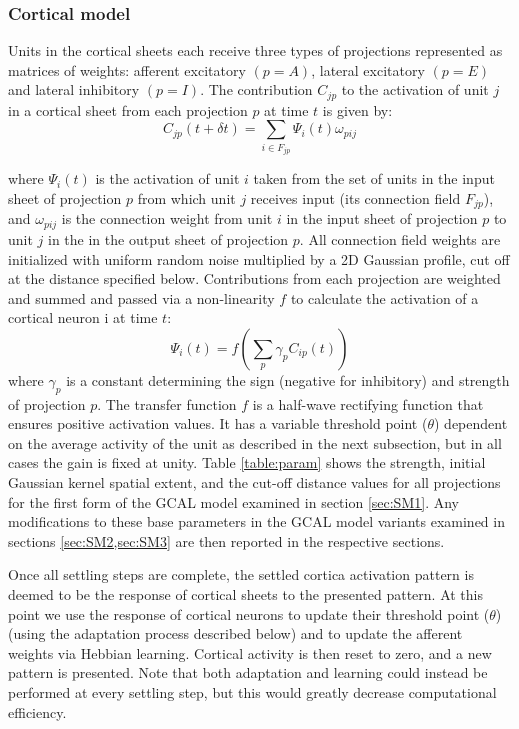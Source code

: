 \documentclass[a4paper,10pt]{article}
\begin{document}
\subsubsection{Cortical model}

Units in the cortical sheets each receive three types of projections represented as matrices of weights: afferent excitatory $(p=A)$, 
lateral excitatory $(p=E)$ and lateral inhibitory $(p=I)$.  The contribution $C_{jp}$ to the activation of unit $j$ in a cortical sheet from each projection $p$ at time $t$ is given by: 
\begin{equation} 
C_{jp}(t+\delta t)=\sum_{i\in F_{jp}}\Psi_{i}(t)\omega_{pij} 
\end{equation} 

\noindent where $\Psi_{i}(t)$ is the activation of unit $i$ taken from the set of units in the input
sheet of projection $p$ from which unit $j$ receives input (its connection field $F_{jp}$), and $\omega_{pij}$ is the connection
weight from unit $i$ in the input sheet of projection $p$ to unit $j$ in the in the output sheet of projection $p$. All connection field
weights are initialized with uniform random noise multiplied by a 2D Gaussian profile, cut off at the distance specified below.
Contributions from each projection are weighted and summed and passed via a non-linearity $f$ to calculate the activation of a cortical neuron i at time $t$:
\begin{equation}
\Psi_{i}(t)= f(\sum_{p}\gamma_{p}C_{ip}(t))
\end{equation}
where $\gamma_{p}$ is a constant determining the sign (negative for inhibitory) and strength of projection $p$. 
The transfer function $f$ is a half-wave rectifying function that ensures positive activation values. It has a 
variable threshold point ($\theta$) dependent on the average activity of the unit as described in the next subsection, 
but in all cases the gain is fixed at unity. Table \ref{table:param} shows the strength, initial Gaussian kernel spatial extent, and the cut-off distance values for all projections for the first form of the GCAL model examined in section \ref{sec:SM1}. Any modifications to these base parameters 
in the GCAL model variants examined in sections \ref{sec:SM2,sec:SM3} are then reported in the respective sections.

Once all  settling steps are complete, the settled cortica activation pattern is deemed to be the response of cortical sheets to 
the presented pattern. At this point we use the response of cortical neurons to update their threshold point ($\theta$) (using the adaptation process described below) and to update the afferent weights via Hebbian learning. Cortical activity is then reset to zero, and a new pattern is presented. Note that both adaptation and learning could instead be performed at every settling step, but this would greatly decrease computational efficiency.
\end{document}
